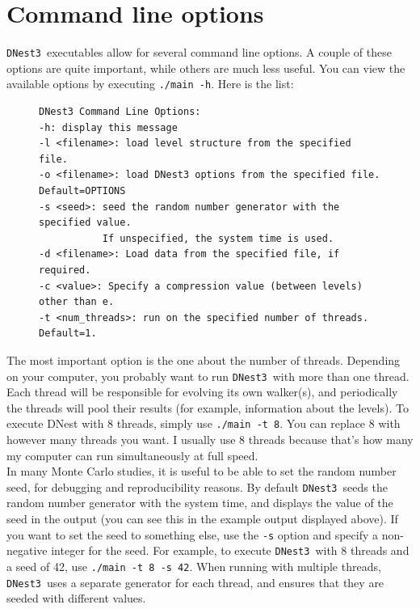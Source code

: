 \documentclass[a4paper, 11pt]{article}
\newcommand{\dnest}{{\tt DNest3}}
\begin{document}
\section{Command line options}\label{sec:commandline}
\dnest~executables allow for several command line options. A couple of these
options are quite important, while others are much less useful.
You can view the available options by executing
{\tt ./main -h}. Here is the list:\\

\begin{figure}
\begin{framed}
\begin{verbatim}
DNest3 Command Line Options:
-h: display this message
-l <filename>: load level structure from the specified file.
-o <filename>: load DNest3 options from the specified file. Default=OPTIONS
-s <seed>: seed the random number generator with the specified value.
           If unspecified, the system time is used.
-d <filename>: Load data from the specified file, if required.
-c <value>: Specify a compression value (between levels) other than e.
-t <num_threads>: run on the specified number of threads. Default=1.
\end{verbatim}
\end{framed}
\end{figure}

The most important option is the one about the number of threads. Depending on
your computer, you probably want to run \dnest~with more than one thread.
Each thread will be responsible for evolving its own walker(s), and periodically
the threads will pool their results (for example, information about the
levels). To execute DNest with 8 threads, simply use {\tt ./main -t 8}. You can
replace 8 with however many threads you want. I usually use 8 threads because
that's how many my computer can run simultaneously at full speed.\\

In many Monte Carlo studies, it is useful to be able to set the random number
seed, for debugging and reproducibility reasons. By default \dnest~seeds the
random number generator with the system time, and displays the value of the
seed in the output (you can see this in the example output displayed above).
If you want to set the seed to
something else, use the {\tt -s} option and specify a non-negative integer for
the seed. For example, to execute \dnest~with
8 threads and a seed of 42, use {\tt ./main -t 8 -s 42}.
When running with multiple threads, \dnest~uses a separate generator for each
thread, and ensures that they are seeded with different values.\\
\end{document}
